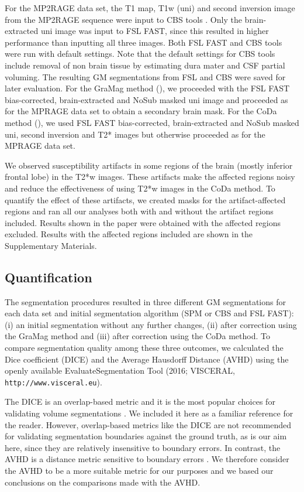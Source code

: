For the MP2RAGE data set, the T1 map, T1w (uni) and second inversion image from the MP2RAGE sequence were input to CBS tools \cite{Bazin2014}. Only the brain-extracted \cite{Smith2002} uni image was input to FSL FAST, since this resulted in higher performance than inputting all three images. Both FSL FAST and CBS tools were run with default settings. Note that the default settings for CBS tools include removal of non brain tissue by estimating dura mater and CSF partial voluming. The resulting GM segmentations from FSL and CBS were saved for later evaluation. For the GraMag method (), we proceeded with the FSL FAST bias-corrected, brain-extracted and NoSub masked uni image and proceeded as for the MPRAGE data set to obtain a secondary brain mask. For the CoDa method (), we used FSL FAST bias-corrected, brain-extracted and NoSub masked uni, second inversion and T2* images but otherwise proceeded as for the MPRAGE data set.

We observed susceptibility artifacts in some regions of the brain (mostly inferior frontal lobe) in the T2*w images. These artifacts make the affected regions noisy and reduce the effectiveness of using T2*w images in the CoDa method. To quantify the effect of these artifacts, we created masks for the artifact-affected regions and ran all our analyses both with and without the artifact regions included. Results shown in the paper were obtained with the affected regions excluded. Results with the affected regions included are shown in the Supplementary Materials.

\subsection{Quantification}
The segmentation procedures resulted in three different GM segmentations for each data set and initial segmentation algorithm (SPM or CBS and FSL FAST): (i) an initial segmentation without any further changes, (ii) after correction using the GraMag method and (iii) after correction using the CoDa method. To compare segmentation quality among these three outcomes, we calculated the Dice coefficient (DICE) and the Average Hausdorff Distance (AVHD) using the openly available EvaluateSegmentation Tool (2016; VISCERAL, \texttt{http://www.visceral.eu}).

The DICE is an overlap-based metric and it is the most popular choices for validating volume segmentations \cite{Taha2015}. We included it here as a familiar reference for the reader. However, overlap-based metrics like the DICE are not recommended for validating segmentation boundaries against the ground truth, as is our aim here, since they are relatively insensitive to boundary errors. In contrast, the AVHD is a distance metric sensitive to boundary errors \cite{Taha2015}. We therefore consider the AVHD to be a more suitable metric for our purposes and we based our conclusions on the comparisons made with the AVHD. 

